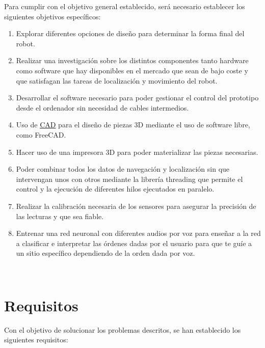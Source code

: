Para cumplir con el objetivo general establecido, será necesario establecer los siguientes objetivos específicos:


\begin{enumerate}
 \item Explorar diferentes opciones de diseño para determinar la forma final del robot.
 \item Realizar una investigación sobre los distintos componentes tanto hardware como software que hay disponibles en el mercado que sean 
de bajo coste y que satisfagan las tareas de localización y movimiento del robot.
 \item Desarrollar el software necesario para poder gestionar el control del prototipo desde el ordenador sin necesidad de cables intermedios.
 \item Uso de \hyperlink{CAD}{CAD} para el diseño de piezas 3D mediante el uso de software libre, como FreeCAD.
 \item Hacer uso de una impresora 3D para poder materializar las piezas necesarias. 
 \item Poder combinar todos los datos de navegación y localización sin que intervengan unos con otros mediante la librería threading que permite el control y la ejecución de diferentes hilos  ejecutados en paralelo.
 \item Realizar la calibración necesaria de los sensores para asegurar la precisión de las lecturas y que sea fiable.
 \item Entrenar una red neuronal con diferentes audios por voz para enseñar a la red a clasificar e interpretar las órdenes dadas por el usuario para
 que te guíe a un sitio específico dependiendo de la orden dada por voz.
\end{enumerate}\


\section{Requisitos}
\label{sec:requisitos}

Con el objetivo de solucionar los problemas descritos, se han establecido los siguientes requisitos:

